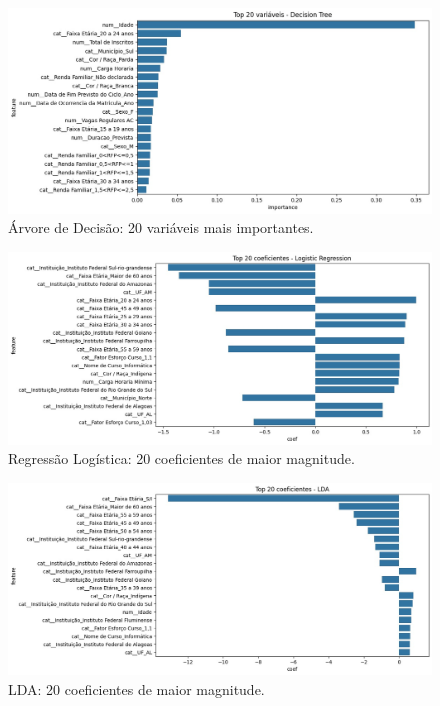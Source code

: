 \documentclass[english, spanish, brazilian]{RBIEarticle} %
\begin{document}
\begin{figure}[H]\centering
    \includegraphics[width=1\textwidth]{images/top20-decision-tree.jpeg}
    \caption{Árvore de Decisão: 20 variáveis mais importantes.}
    \label{fig:feat-dt}
\end{figure}

\begin{figure}[H]\centering
    \includegraphics[width=1\textwidth]{images/top20-regr-log.jpeg}
    \caption{Regressão Logística: 20 coeficientes de maior magnitude.}
    \label{fig:feat-lr}
\end{figure}

\begin{figure}[H]\centering
    \includegraphics[width=1\textwidth]{images/top20-lda.jpeg}
    \caption{LDA: 20 coeficientes de maior magnitude.}
    \label{fig:feat-lda}
\end{figure}
\end{document}
